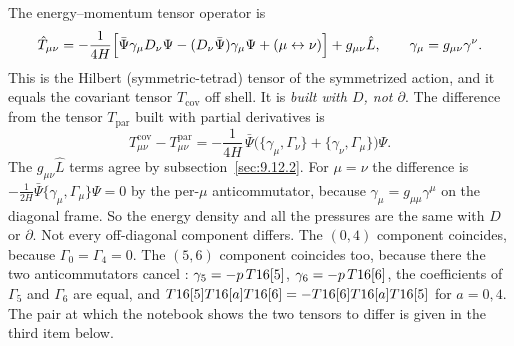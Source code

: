 The energy--momentum tensor operator is
\begin{equation}
  \hat T_{\mu\nu}=-\frac{1}{4H}\Bigl[\bar\Psi\gamma_\mu D_\nu\Psi-(D_\nu\bar\Psi)\gamma_\mu\Psi+(\mu\leftrightarrow\nu)\Bigr]+g_{\mu\nu}\hat L,
  \qquad \gamma_\mu=g_{\mu\nu}\gamma^\nu .
\end{equation}
This is the Hilbert (symmetric-tetrad) tensor of the symmetrized action, and it equals the
covariant tensor $T_{\text{cov}}$ off shell. It is \emph{built with $D$, not $\partial$}. The
difference from the tensor $T_{\text{par}}$ built with partial derivatives is \cfderived
\begin{equation}
  T^{\text{cov}}_{\mu\nu}-T^{\text{par}}_{\mu\nu}=-\frac{1}{4H}\,\bar\Psi\bigl(\{\gamma_\mu,\Gamma_\nu\}+\{\gamma_\nu,\Gamma_\mu\}\bigr)\Psi .
\end{equation}
The $g_{\mu\nu}\hat L$ terms agree by subsection~\ref{sec:9.12.2}. For $\mu=\nu$ the difference is
$-\frac{1}{2H}\bar\Psi\{\gamma_\mu,\Gamma_\mu\}\Psi=0$ by the per-$\mu$ anticommutator, because
$\gamma_\mu=g_{\mu\mu}\gamma^\mu$ on the diagonal frame. So the energy density and all the pressures
are the same with $D$ or $\partial$. Not every off-diagonal component differs. The $(0,4)$
component coincides, because $\Gamma_0=\Gamma_4=0$. The $(5,6)$ component coincides too, because
there the two anticommutators cancel \cfderived: $\gamma_5=-p\,T16[5]$, $\gamma_6=-p\,T16[6]$,
the coefficients of $\Gamma_5$ and $\Gamma_6$ are equal, and
$T16[5]T16[a]T16[6]=-T16[6]T16[a]T16[5]$ for $a=0,4$. The pair at which the
notebook shows the two tensors to differ is given in the third item below.
